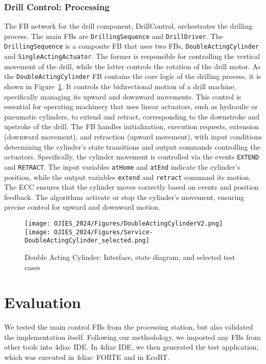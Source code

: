 \subsubsection{Drill Control: Processing}
The FB network for the drill component, DrillControl, orchestrates the drilling process. The main FBs are \texttt{DrillingSequence} and \texttt{DrillDriver}. The \texttt{DrillingSequence} is a composite FB that uses two FBs, \texttt{DoubleActingCylinder} and \texttt{SingleActingAc\-tu\-a\-tor}. The former is responsible for controlling the vertical movement of the drill, while the latter controls the rotation of the drill motor. As the \texttt{DoubleActingCylinder} FB contains the core logic of the drilling process, it is shown in Figure~\ref{fig:DoubleActingCylinder}. It controls the bidirectional motion of a drill machine, specifically managing its upward and downward movements. This control is essential for operating machinery that uses linear actuators, such as hydraulic or pneumatic cylinders, to extend and retract, corresponding to the downstroke and upstroke of the drill. The FB handles initialization, execution requests, extension (downward movement), and retraction (upward movement), with input conditions determining the cylinder's state transitions and output commands controlling the actuators.
Specifically, the cylinder movement is controlled via the events \texttt{EXTEND} and \texttt{RETRACT}. The input variables \texttt{atHome} and \texttt{atEnd} indicate the cylinder's position, while the output variables \texttt{extend} and \texttt{retract} command its motion. The ECC %
ensures that the cylinder moves correctly based on events and position feedback. The algorithms activate or stop the cylinder's movement, ensuring precise control for upward and downward motion. 
\begin{figure}[hbt]
	\centering
		\texttt{[image: OJIES\_2024/Figures/DoubleActingCylinderV2.png]}
            \texttt{[image: OJIES\_2024/Figures/Service-DoubleActingCylinder\_selected.png]}
		\caption{Double Acting Cylinder: Interface, state diagram, and selected test cases}
		\label{fig:DoubleActingCylinder}	
 \end{figure}

\section{Evaluation}
We tested the main control FBs from the processing station, but also validated the implementation itself. Following our methodology, we imported any FBs from other tools into 4diac IDE. In 4diac IDE, we then generated the test application, which was executed in 4diac~FORTE and in EcoRT.

